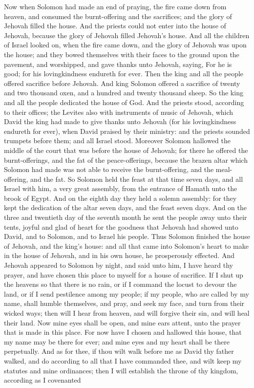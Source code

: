 Now when Solomon had made an end of praying, the fire came down from heaven, and consumed the burnt-offering and the sacrifices; and the glory of Jehovah filled the house. And the priests could not enter into the house of Jehovah, because the glory of Jehovah filled Jehovah’s house. And all the children of Israel looked on, when the fire came down, and the glory of Jehovah was upon the house; and they bowed themselves with their faces to the ground upon the pavement, and worshipped, and gave thanks unto Jehovah, saying, For he is good; for his lovingkindness endureth for ever.  Then the king and all the people offered sacrifice before Jehovah. And king Solomon offered a sacrifice of twenty and two thousand oxen, and a hundred and twenty thousand sheep. So the king and all the people dedicated the house of God. And the priests stood, according to their offices; the Levites also with instruments of music of Jehovah, which David the king had made to give thanks unto Jehovah (for his lovingkindness endureth for ever), when David praised by their ministry: and the priests sounded trumpets before them; and all Israel stood. Moreover Solomon hallowed the middle of the court that was before the house of Jehovah; for there he offered the burnt-offerings, and the fat of the peace-offerings, because the brazen altar which Solomon had made was not able to receive the burnt-offering, and the meal-offering, and the fat.  So Solomon held the feast at that time seven days, and all Israel with him, a very great assembly, from the entrance of Hamath unto the brook of Egypt. And on the eighth day they held a solemn assembly: for they kept the dedication of the altar seven days, and the feast seven days. And on the three and twentieth day of the seventh month he sent the people away unto their tents, joyful and glad of heart for the goodness that Jehovah had showed unto David, and to Solomon, and to Israel his people.  Thus Solomon finished the house of Jehovah, and the king’s house: and all that came into Solomon’s heart to make in the house of Jehovah, and in his own house, he prosperously effected. And Jehovah appeared to Solomon by night, and said unto him, I have heard thy prayer, and have chosen this place to myself for a house of sacrifice. If I shut up the heavens so that there is no rain, or if I command the locust to devour the land, or if I send pestilence among my people; if my people, who are called by my name, shall humble themselves, and pray, and seek my face, and turn from their wicked ways; then will I hear from heaven, and will forgive their sin, and will heal their land. Now mine eyes shall be open, and mine ears attent, unto the prayer that is made in this place. For now have I chosen and hallowed this house, that my name may be there for ever; and mine eyes and my heart shall be there perpetually. And as for thee, if thou wilt walk before me as David thy father walked, and do according to all that I have commanded thee, and wilt keep my statutes and mine ordinances; then I will establish the throne of thy kingdom, according as I covenanted 